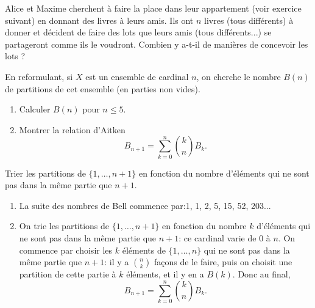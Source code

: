 \begin{exo}
Alice et Maxime cherchent à faire la place dans leur appartement (voir exercice suivant) en donnant des livres à leurs amis. Ils ont $n$ livres (tous différents) à donner et décident de faire des lots que leurs amis (tous différents...) se partageront comme ils le voudront. Combien y a-t-il de manières de concevoir les lots ?

En reformulant, si $X$ est un ensemble de cardinal $n$, on cherche le nombre $B(n)$ de partitions de cet ensemble (en parties non vides). 

\begin{enumerate}
\item Calculer $B(n)$ pour $n\leq 5$.
\item Montrer la relation d'Aitken
\[B_{n+1} = \sum_{k=0}^{n} \binom{k}{n}B_k.  \]
\end{enumerate}

\begin{hint} %
Trier les partitions de $\{1, \dots, n+1\}$ en fonction du nombre d'éléments qui ne sont pas dans la même partie que $n+1$.
\end{hint}

\begin{sol} %
\begin{enumerate}
\item La suite des nombres de Bell commence par:1, 1, 2, 5, 15, 52, 203...
\item On trie les partitions de $\{1, \dots, n+1\}$ en fonction du nombre $k$ d'éléments qui ne sont pas dans la même partie que $n+1$: ce cardinal varie de $0$ à $n$. On commence par choisir les $k$ éléments de $\{1, \dots,n\}$ qui ne sont pas dans la même partie que $n+1$: il y a ${n \choose k}$ façons de le faire, puis on choisit une partition de cette partie à $k$ éléments, et il y en a $B(k)$. Donc au final, 
\[B_{n+1} = \sum_{k=0}^{n} \binom{k}{n}B_k.  \]

\end{enumerate}
\end{sol}
\end{exo}


